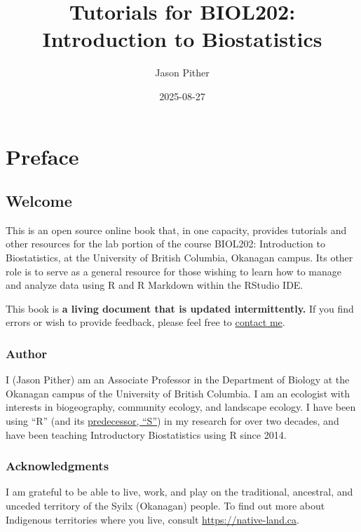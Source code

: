\documentclass[
]{book}
\title{Tutorials for BIOL202: Introduction to Biostatistics}
\author{Jason Pither}
\date{2025-08-27}
\begin{document}
\maketitle

{
\setcounter{tocdepth}{1}
\tableofcontents
}
\part*{Preface}\label{part-preface}

\chapter*{Welcome}\label{welcome}

This is an open source online book that, in one capacity, provides tutorials and other resources for the lab portion of the course BIOL202: Introduction to Biostatistics, at the University of British Columbia, Okanagan campus. Its other role is to serve as a general resource for those wishing to learn how to manage and analyze data using R and R Markdown within the RStudio IDE.

This book is \textbf{a living document that is updated intermittently.} If you find errors or wish to provide feedback, please feel free to \href{https://jasonpither.weebly.com/people.html}{contact me}.

\section*{Author}\label{author}

I (Jason Pither) am an Associate Professor in the Department of Biology at the Okanagan campus of the University of British Columbia. I am an ecologist with interests in biogeography, community ecology, and landscape ecology. I have been using ``R'' (and its \href{https://en.wikipedia.org/wiki/R_(programming_language)\#History}{predecessor, ``S''}) in my research for over two decades, and have been teaching Introductory Biostatistics using R since 2014.

\section*{Acknowledgments}\label{acknowledgments}

I am grateful to be able to live, work, and play on the traditional, ancestral, and unceded territory of the Syilx (Okanagan) people. To find out more about Indigenous territories where you live, consult \url{https://native-land.ca}.
\end{document}
